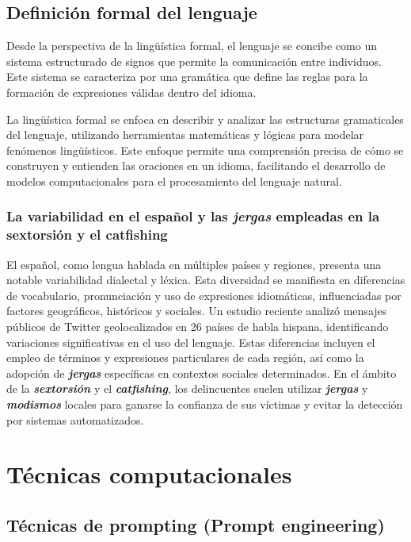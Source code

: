 \subsection{Definición formal del lenguaje}

Desde la perspectiva de la lingüística formal, el lenguaje se concibe como un sistema estructurado de signos que permite la comunicación entre individuos. Este sistema se caracteriza por una gramática que define las reglas para la formación de expresiones válidas dentro del idioma.

La lingüística formal se enfoca en describir y analizar las estructuras gramaticales del lenguaje, utilizando herramientas matemáticas y lógicas para modelar fenómenos lingüísticos. Este enfoque permite una comprensión precisa de cómo se construyen y entienden las oraciones en un idioma, facilitando el desarrollo de modelos computacionales para el procesamiento del lenguaje natural.

\subsubsection{La variabilidad en el español y las \textbf{\textit{jergas}} empleadas en la sextorsión y el catfishing}

El español, como lengua hablada en múltiples países y regiones, presenta una notable variabilidad dialectal y léxica. Esta diversidad se manifiesta en diferencias de vocabulario, pronunciación y uso de expresiones idiomáticas, influenciadas por factores geográficos, históricos y sociales. Un estudio reciente \cite{regionalizespanish2022} analizó mensajes públicos de Twitter geolocalizados en 26 países de habla hispana, identificando variaciones significativas en el uso del lenguaje. Estas diferencias incluyen el empleo de términos y expresiones particulares de cada región, así como la adopción de \textbf{\textit{jergas}} específicas en contextos sociales determinados. En el ámbito de la \textbf{\textit{sextorsión}} y el \textbf{\textit{catfishing}}, los delincuentes suelen utilizar \textbf{\textit{jergas}} y \textbf{\textit{modismos}} locales para ganarse la confianza de sus víctimas y evitar la detección por sistemas automatizados.

\section{Técnicas computacionales}

\subsection{Técnicas de prompting (Prompt engineering)}

